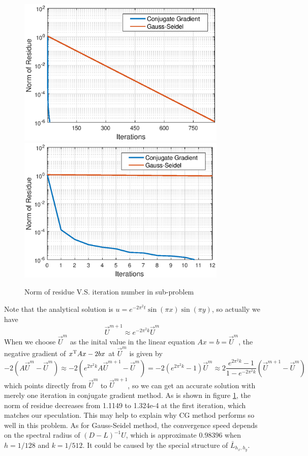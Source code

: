 \documentclass[12pt]{article}
\begin{document}
\begin{figure}[!htb]
\centerline{
	\includegraphics[width = 10cm]{CG_GS.eps}
	\includegraphics[width = 10cm]{CG_GS_zoom.eps}
}
\caption{Norm of residue V.S. iteration number in sub-problem}
\label{fig:CG_GS}
\end{figure}
Note that the analytical solution is $u = e^{-2\pi^2t}\sin(\pi x)\sin(\pi y)$, so actually we have 
$$
\vec{U}^{m+1}\approx e^{-2\pi^2k}\vec{U}^m
$$
When we choose $\vec{U}^m$ as the inital value in the linear equation $Ax = b = \vec{U}^m$, the negative gradient of $x^{\rm T}Ax - 2bx$ at $\vec{U}^m$ is given by 
$$
-2(A\vec{U}^m - \vec{U}^m) \approx -2(e^{2\pi^2k}A\vec{U}^{m+1} - \vec{U}^m) = -2(e^{2\pi^2k}-1)\vec{U}^m \approx 2\frac{e^{2\pi^2k}-1}{1-e^{-2\pi^2k}}\left(\vec{U}^{m+1} - \vec{U}^m\right)
$$
which points directly from $\vec{U}^{m}$ to $\vec{U}^{m+1}$, so we can get an accurate solution with merely one iteration in conjugate gradient method. As is shown in figure \ref{fig:CG_GS}, the norm of residue decreases from 1.1149 to 1.324e-4 at the first iteration, which matches our speculation. This may help to explain why CG method performs so well in this problem. As for Gauss-Seidel method, the convergence speed depends on the spectral radius of $(D-L)^{-1}U$, which is approximate $0.98396$ when $h = 1/128$ and $k = 1/512$. It could be caused by the special structure of $\bar{L}_{h_x,h_y}$. 
\end{document}
